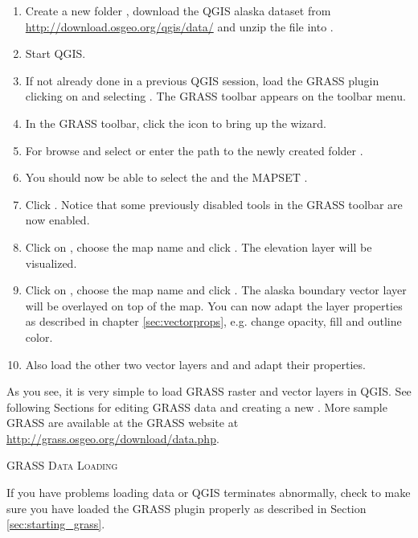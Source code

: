 \begin{enumerate}
 \item Create a new folder , download the QGIS alaska
  dataset  from
  \url{http://download.osgeo.org/qgis/data/} and unzip the file into
  .
  \item Start QGIS.
  \item If not already done in a previous QGIS session, load the GRASS plugin
  clicking on  \arrow {} and
  selecting . The GRASS toolbar appears on the toolbar menu.
  \item In the GRASS toolbar, click the  icon to bring up the  wizard.
  \item For  browse and select or enter the path to the
  newly created folder .
  \item You should now be able to select the 
  and the MAPSET .
  \item Click . Notice that some previously disabled tools in the
  GRASS toolbar are now enabled.
  \item Click on ,
  choose the map name  and click . The elevation
  layer will be visualized.
  \item Click on ,
  choose the map name  and click . The alaska
  boundary vector layer will be overlayed on top of the  map. You can
  now adapt the layer properties as described in chapter \ref{sec:vectorprops},
  e.g. change opacity, fill and outline color.
  \item Also load the other two vector layers  and
   and adapt their properties.
\end{enumerate}

As you see, it is very simple to load GRASS raster and vector layers in QGIS.
See following Sections for editing GRASS data and creating a new
. More sample GRASS  are available at
the GRASS website at \url{http://grass.osgeo.org/download/data.php}.

\begin{Tip}\caption{\textsc{GRASS Data Loading}}
If you have problems loading data or QGIS terminates abnormally,
check to make sure you have loaded the GRASS plugin properly as described in
Section \ref{sec:starting_grass}.
\end{Tip}

